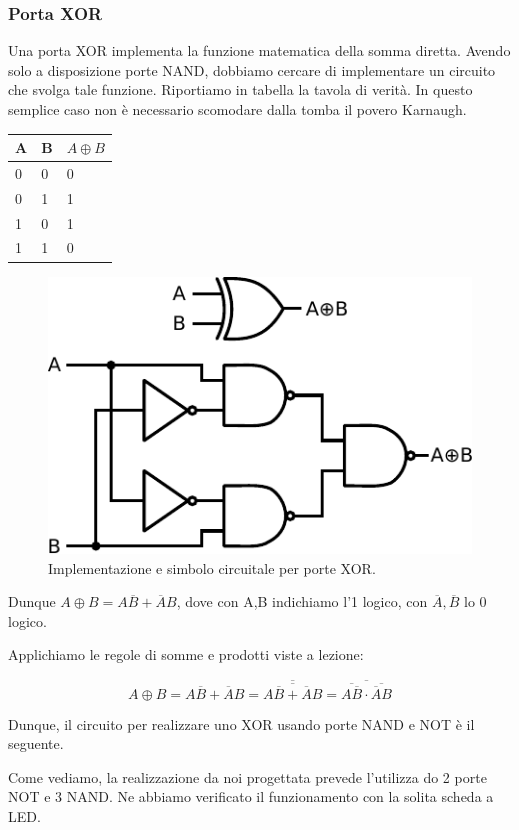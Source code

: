 \subsubsection{Porta XOR}

Una porta XOR implementa la funzione matematica della somma diretta. Avendo solo a disposizione porte NAND, dobbiamo cercare di implementare un circuito che svolga tale funzione. Riportiamo in tabella la tavola di verità. In questo semplice caso non è necessario scomodare dalla tomba il povero Karnaugh.

\begin{tabular}{|l|l|l|}
\hline
A & B & $A \oplus B$ \\
\hline
0 & 0 & 0\\
\hline
0 & 1 & 1\\
\hline
1 & 0 & 1\\
\hline
1 & 1 & 0\\
\hline
\end{tabular}

\begin{figure}
\centering
\includegraphics[width=.30\textwidth]{../E09/latex/XOR.pdf}
\caption{Implementazione e simbolo circuitale per porte XOR.}
\label{cir9:xor}
\end{figure}

Dunque $A \oplus B=A\overline B + \overline A B$, dove con A,B indichiamo l'1 logico, con $\overline A,\overline B$ lo 0 logico.

Applichiamo le regole di somme e prodotti viste a lezione:

$$A \oplus B=A\overline B + \overline A B=\overline{\overline{A\overline B + \overline A B}}=\overline{\overline{A\overline B} \cdot \overline{\overline A B}}$$

Dunque, il circuito per realizzare uno XOR usando porte NAND e NOT è il seguente.



Come vediamo, la realizzazione da noi progettata prevede l'utilizza do 2 porte NOT e 3 NAND. Ne abbiamo verificato il funzionamento con la solita scheda a LED.





